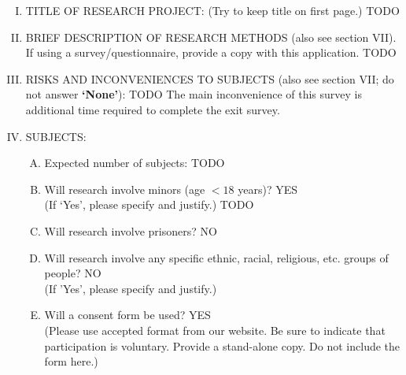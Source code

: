 \documentclass[12pt]{article}
\newcommand{\response}[1]{{\color{blue}#1}}
\newcommand{\yes}{{\color{blue}YES}\\ }
\newcommand{\no}{{\color{blue}NO}\\ }
\begin{document}
\begin{enumerate}[I.]
        If yes, please contact the Office of Research Compliance at
        406.994.6757 for further guidance.

    \item TITLE OF RESEARCH PROJECT:  (Try to keep title on first page.)
        \response{TODO}

    \item BRIEF DESCRIPTION OF RESEARCH METHODS (also see section VII).  If
        using a survey/questionnaire,
                  provide a copy with this application.
                  \response{TODO
                  }

    \item RISKS AND INCONVENIENCES TO SUBJECTS (also see section VII; do not
        answer {\bf `None'}): \response{TODO
        The main inconvenience of this survey is additional time required to complete
    the exit survey.}

    \item SUBJECTS:
        \begin{enumerate}[A.]
            \item Expected number of subjects: \response{TODO}
            \item Will research involve minors (age $<18$ years)?  \yes
                        (If `Yes', please specify and justify.)
                        \response{TODO}
            \item Will research involve prisoners? \no
            \item Will research involve any specific ethnic, racial,
                religious, etc.  groups of people? \no
                (If 'Yes', please specify and justify.)
            \item Will a consent form be used?  \yes
                (Please use accepted format
                from our website. Be sure to indicate that participation is
                voluntary. Provide a stand-alone copy. Do not include the form
                here.)
        \end{enumerate}


\end{enumerate}
\end{document}

